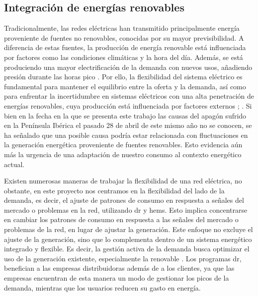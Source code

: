 \documentclass[11pt,a4paper]{book}
\begin{document}
\subsection{Integración de energías renovables}
Tradicionalmente, las redes eléctricas han transmitido principalmente energía proveniente de fuentes no renovables, conocidas por su mayor previsibilidad. A diferencia de estas fuentes, la producción de energía renovable está \mbox{influenciada} por factores como las condiciones climáticas y la hora del día. Además, se está produciendo una mayor electrificación de la demanda con nuevos usos, añadiendo presión durante las horas pico \cite{cordisPredicting2023}.
Por ello, la flexibilidad del sistema eléctrico es fundamental para mantener el equilibrio entre la oferta y la demanda, así como para enfrentar la incertidumbre en sistemas eléctricos con una alta penetración de energías renovables, cuya producción está influenciada por factores externos \cite{Impram2020ChallengesOR}; \cite{Rahman2024AnOO}. Si bien en la fecha en la que se presenta este trabajo las causas del apagón sufrido en la Península Ibérica el pasado 28 de abril de este mismo año no se conocen, se ha señalado que una posible causa podría estar relacionada con fluctuaciones en la generación energética proveniente de fuentes renovables. Esto evidencia aún más la urgencia de una adaptación de nuestro consumo al contexto energético actual.

Existen numerosas maneras de trabajar la flexibilidad de una red eléctrica, no obstante, en este proyecto nos centramos en la flexibilidad del lado de la demanda, es decir, el ajuste de patrones de consumo en respuesta a señales del mercado o problemas en la red, utilizando \gls{dr} y \gls{hems}. Esto implica concentrarse en cambiar los patrones de consumo en respuesta a las señales del mercado o problemas de la red, en lugar de ajustar la generación. Este enfoque no excluye el ajuste de la generación, sino que lo complementa dentro de un sistema energético integrado y flexible. Es decir, la gestión activa de la demanda busca optimizar el uso de la generación existente, especialmente la renovable \cite{renewableRevolution2024}. Los programas \gls{dr}, benefician a las empresas distribuidoras además de a los clientes, ya que las empresas encuentran de esta manera un modo de gestionar los picos de la demanda, mientras que los usuarios reducen su gasto en energía. 
\end{document}
